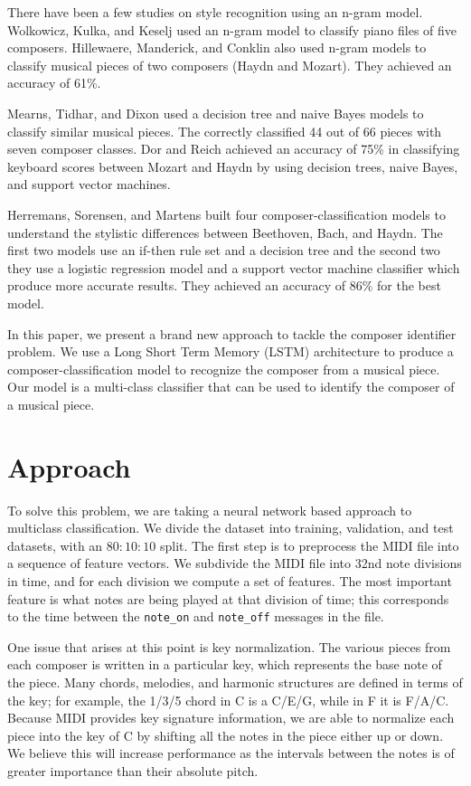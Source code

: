 \documentclass[11pt,a4paper]{article}
\begin{document}
There have been a few studies on style recognition using an n-gram model. Wolkowicz, Kulka, and Keselj \cite{n-gram} used an n-gram model to classify piano files of five composers.  Hillewaere, Manderick, and Conklin \cite{Hillewaere} also used n-gram models to classify musical pieces of two composers (Haydn and Mozart). They achieved an accuracy of 61\%.

Mearns, Tidhar, and Dixon \cite{Mearns} used a decision tree and naive Bayes models to classify similar musical pieces. The correctly classified 44 out of 66 pieces with seven composer classes. Dor and Reich \cite{Dor} achieved an accuracy of 75\% in classifying keyboard scores between Mozart and Haydn by using decision trees, naive Bayes, and support vector machines.

Herremans, Sorensen, and Martens \cite {Herremans} built four composer-classification models to understand the stylistic differences between Beethoven, Bach, and Haydn. The first two models use an if-then rule set and a decision tree and the second two they use a logistic regression model and a support vector machine classifier which produce more accurate results. They achieved an accuracy of 86\% for the best model. 

In this paper, we present a brand new approach to tackle the composer identifier problem. We use a Long Short Term Memory (LSTM) architecture to produce a composer-classification model to recognize the composer from a musical piece. Our model is a multi-class classifier that can be used to identify the composer of a musical piece. 


\section{Approach}
To solve this problem, we are taking a neural network based approach to multiclass classification. We divide the dataset into training, validation, and test datasets, with an $80:10:10$ split. The first step is to preprocess the MIDI file into a sequence of feature vectors. We subdivide the MIDI file into 32nd note divisions in time, and for each division we compute a set of features. The most important feature is what notes are being played at that division of time; this corresponds to the time between the \texttt{note\_on}  and \texttt{note\_off}  messages in the file. 

One issue that arises at this point is key normalization. The various pieces from each composer is written in a particular key, which represents the base note of the piece. Many chords, melodies, and harmonic structures are defined in terms of the key; for example, the 1/3/5 chord in C is a C/E/G, while in F it is F/A/C. Because MIDI provides key signature information, we are able to normalize each piece into the key of C by shifting all the notes in the piece either up or down. We believe this will increase performance as the intervals between the notes is of greater importance than their absolute pitch.
\end{document}
